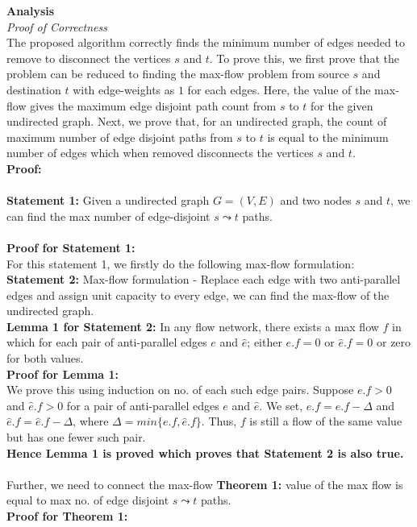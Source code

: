 \documentclass{article}
\newcommand{\curvy}{\mathrel{\leadsto}}
\begin{document}
\pagebreak
\textbf{Analysis}\\
\textit{Proof of Correctness}\\
The proposed algorithm correctly finds the minimum number of edges needed to remove to disconnect the vertices $s$ and $t$. To prove this, we first prove that the problem can be reduced to finding the max-flow problem from source $s$ and destination $t$ with edge-weights as $1$ for each edges. Here, the value of the max-flow gives the maximum edge disjoint path count from $s$ to $t$ for the given undirected graph. Next, we prove that, for an undirected graph, the count of maximum number of edge disjoint paths from $s$ to $t$ is equal to the minimum number of edges which when removed disconnects the vertices $s$ and $t$.\\
\textbf{Proof:}\\\\
\textbf{Statement 1: } Given a undirected graph $G = (V, E)$ and two nodes $s$ and $t$, we can find the max number of edge-disjoint $s\curvy t$ paths.\\\\
\textbf{Proof for Statement 1:}\\
For this statement 1, we firstly do the following max-flow formulation:\\
\textbf{Statement 2: } Max-flow formulation - Replace each edge with two anti-parallel edges and assign unit capacity to every edge, we can find the max-flow of the undirected graph.\\
\textbf{Lemma 1 for Statement 2: } In any flow network, there exists a max flow $f$ in which for each pair of anti-parallel edges $e$ and $\hat{e}$; either $e.f = 0$ or $\hat{e}.f=0$ or zero for both values.\\
\textbf{Proof for Lemma 1:} \\
We prove this using induction on no. of each such edge pairs. Suppose $e.f>0$ and $\hat{e}.f>0$ for a pair of anti-parallel edges $e$ and $\hat{e}$.
We set, $e.f=e.f-\Delta$ and $\hat{e}.f=\hat{e}.f-\Delta$, where $\Delta=min\{e.f, \hat{e}.f\}$. Thus, $f$ is still a flow of the same value but has one fewer such pair.\\
\textbf{Hence Lemma 1 is proved which proves that Statement 2 is also true.}\\\\
Further, we need to connect the max-flow 
\textbf{Theorem 1:} value of the max flow is equal to max no. of edge disjoint $s\curvy t$ paths.\\
\textbf{Proof for Theorem 1:} 
\end{document}
